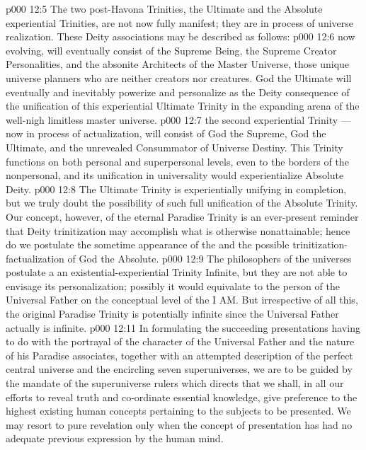 \vs p000 12:5 \pc The two post\hyp{}Havona Trinities, the Ultimate and the Absolute experiential Trinities, are not now fully manifest; they are in process of universe realization. These Deity associations may be described as follows:
\vs p000 12:6 \bibnobreakspace {} now evolving, will eventually consist of the Supreme Being, the Supreme Creator Personalities, and the absonite Architects of the Master Universe, those unique universe planners who are neither creators nor creatures. God the Ultimate will eventually and inevitably powerize and personalize as the Deity consequence of the unification of this experiential Ultimate Trinity in the expanding arena of the well\hyp{}nigh limitless master universe.
\vs p000 12:7 \bibnobreakspace {} the second experiential Trinity --- now in process of actualization, will consist of God the Supreme, God the Ultimate, and the unrevealed Consummator of Universe Destiny. This Trinity functions on both personal and superpersonal levels, even to the borders of the nonpersonal, and its unification in universality would experientialize Absolute Deity.
\vs p000 12:8 \pc The Ultimate Trinity is experientially unifying in completion, but we truly doubt the possibility of such full unification of the Absolute Trinity. Our concept, however, of the eternal Paradise Trinity is an ever\hyp{}present reminder that Deity trinitization may accomplish what is otherwise nonattainable; hence do we postulate the sometime appearance of the  and the possible trinitization\hyp{}factualization of God the Absolute.
\vs p000 12:9 \pc The philosophers of the universes postulate a  an existential\hyp{}experiential Trinity Infinite, but they are not able to envisage its personalization; possibly it would equivalate to the person of the Universal Father on the conceptual level of the I AM. But irrespective of all this, the original Paradise Trinity is potentially infinite since the Universal Father actually is infinite.
\vs p000 12:11 In formulating the succeeding presentations having to do with the portrayal of the character of the Universal Father and the nature of his Paradise associates, together with an attempted description of the perfect central universe and the encircling seven superuniverses, we are to be guided by the mandate of the superuniverse rulers which directs that we shall, in all our efforts to reveal truth and co\hyp{}ordinate essential knowledge, give preference to the highest existing human concepts pertaining to the subjects to be presented. We may resort to pure revelation only when the concept of presentation has had no adequate previous expression by the human mind.
